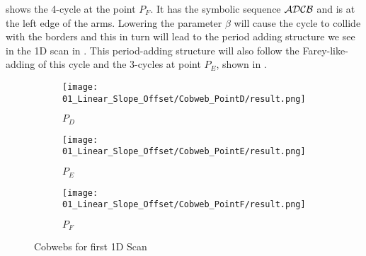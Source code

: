 shows the 4-cycle at the point $P_F$.
It has the symbolic sequence $\mathcal{A}\mathcal{D}\mathcal{C}\mathcal{B}$ and is at the left edge of the arms.
Lowering the parameter $\beta$ will cause the cycle to collide with the borders and this in turn will lead to the period adding structure we see in the 1D scan in .
This period-adding structure will also follow the Farey-like-adding of this cycle and the 3-cycles at point $P_E$, shown in .

\begin{figure}
    \centering
    \begin{subfigure}{0.3\textwidth}
        \centering
        \texttt{[image: 01\_Linear\_Slope\_Offset/Cobweb\_PointD/result.png]}
        \caption{$P_D$}
        \label{fig:pcw.lin.CobwebD}
    \end{subfigure}
    \begin{subfigure}{0.3\textwidth}
        \centering
        \texttt{[image: 01\_Linear\_Slope\_Offset/Cobweb\_PointE/result.png]}
        \caption{$P_E$}
        \label{fig:pcw.lin.CobwebE}
    \end{subfigure}
    \begin{subfigure}{0.3\textwidth}
        \centering
        \texttt{[image: 01\_Linear\_Slope\_Offset/Cobweb\_PointF/result.png]}
        \caption{$P_F$}
        \label{fig:pcw.lin.CobwebF}
    \end{subfigure}
    \caption{Cobwebs for first 1D Scan}
    \label{fig:pcw.lin.CobwebD-F}
\end{figure}
